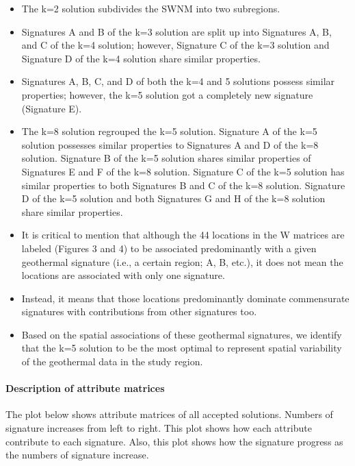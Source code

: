 \documentclass[11pt]{article}
\providecommand{\tightlist}{%
      \setlength{\itemsep}{0pt}\setlength{\parskip}{0pt}}
\begin{document}
\begin{itemize}
\tightlist
\item
  The k=2 solution subdivides the SWNM into two subregions.
\item
  Signatures A and B of the k=3 solution are split up into Signatures A,
  B, and C of the k=4 solution; however, Signature C of the k=3 solution
  and Signature D of the k=4 solution share similar properties.
\item
  Signatures A, B, C, and D of both the k=4 and 5 solutions possess
  similar properties; however, the k=5 solution got a completely new
  signature (Signature E).
\item
  The k=8 solution regrouped the k=5 solution. Signature A of the k=5
  solution possesses similar properties to Signatures A and D of the k=8
  solution. Signature B of the k=5 solution shares similar properties of
  Signatures E and F of the k=8 solution. Signature C of the k=5
  solution has similar properties to both Signatures B and C of the k=8
  solution. Signature D of the k=5 solution and both Signatures G and H
  of the k=8 solution share similar properties.
\item
  It is critical to mention that although the 44 locations in the W
  matrices are labeled (Figures 3 and 4) to be associated predominantly
  with a given geothermal signature (i.e., a certain region; A, B,
  etc.), it does not mean the locations are associated with only one
  signature.
\item
  Instead, it means that those locations predominantly dominate
  commensurate signatures with contributions from other signatures too.
\item
  Based on the spatial associations of these geothermal signatures, we
  identify that the k=5 solution to be the most optimal to represent
  spatial variability of the geothermal data in the study region.
\end{itemize}

    \hypertarget{description-of-attribute-matrices}{%
\paragraph{Description of attribute
matrices}\label{description-of-attribute-matrices}}

The plot below shows attribute matrices of all accepted solutions.
Numbers of signature increases from left to right. This plot shows how
each attribute contribute to each signature. Also, this plot shows how
the signature progress as the numbers of signature increase.
\end{document}
